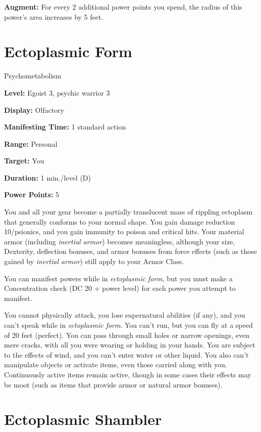 \documentclass{article}
\begin{document}
\textbf{Augment:} For every 2 additional power points you spend, the radius of 
this power's area increases by 5 feet.

\vspace{12pt}
\section*{Ectoplasmic Form}

Psychometabolism

\textbf{Level:} Egoist 3, psychic warrior 3

\textbf{Display:} Olfactory

\textbf{Manifesting Time:} 1 standard action

\textbf{Range:} Personal

\textbf{Target:} You

\textbf{Duration:} 1 min./level (D)

\textbf{Power Points:} 5

You and all your gear become a partially translucent mass of rippling ectoplasm 
that generally conforms to your normal shape. You gain damage reduction 10/psionics, 
and you gain immunity to poison and critical hits. Your material armor (including 
\textit{inertial armor}) becomes meaningless, although your size, Dexterity, deflection 
bonuses, and armor bonuses from force effects (such as those gained by \textit{inertial 
armor}) still apply to your Armor Class.

You can manifest powers while in \textit{ectoplasmic form}, but you must make a 
Concentration check (DC 20 + power level) for each power you attempt to manifest.

You cannot physically attack, you lose supernatural abilities (if any), and you 
can't speak while in \textit{ectoplasmic form}. You can't run, but you can fly 
at a speed of 20 feet (perfect). You can pass through small holes or narrow openings, 
even mere cracks, with all you were wearing or holding in your hands. You are subject 
to the effects of wind, and you can't enter water or other liquid. You also can't 
manipulate objects or activate items, even those carried along with you. Continuously 
active items remain active, though in some cases their effects may be moot (such 
as items that provide armor or natural armor bonuses).

\vspace{12pt}
\section*{Ectoplasmic Shambler}
\end{document}
